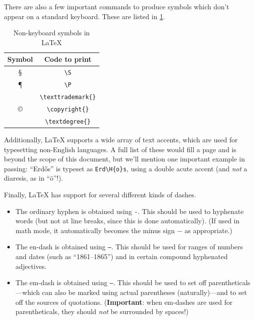 \documentclass{article}
\newcommand*{\code}[1]{\texttt{#1}}
\begin{document}
There are also a few important commands to produce symbols which don't appear on a standard keyboard.
These are listed in \cref{tab:nonkbsymbols}.

\begin{table}[htb]
  \centering{}
  \begin{tabular}{c c}
    \toprule
    Symbol & Code to print \\ \midrule
    \S  & \code{\textbackslash{}S} \\
    \P  & \code{\textbackslash{}P} \\
    \texttrademark{} & \code{\textbackslash{}texttrademark\{\}} \\
    \copyright{} & \code{\textbackslash{}copyright\{\}} \\
    \textdegree{} & \code{\textbackslash{}textdegree\{\}} \\
    \bottomrule
  \end{tabular}
  \caption{Non-keyboard symbols in \LaTeX{}}
  \label{tab:nonkbsymbols}
\end{table}

Additionally, \LaTeX{} supports a wide array of text accents, which are used for typesetting non-English languages.
A full list of these would fill a page and is beyond the scope of this document, but we'll mention one important example in passing: \enquote{Erd\H{o}s} is typeset as \code{Erd\textbackslash{}H\{o\}s}, using a double acute accent (and \emph{not} a diaresis, as in \enquote{\"{o}}!).

Finally, \LaTeX{} has support for several different kinds of dashes.
\begin{itemize}
\item
  The ordinary hyphen is obtained using \code{-}.
  This should be used to hyphenate words (but not at line breaks, since this is done automatically).
  (If used in math mode, it automatically becomes the minus sign $-$ as appropriate.)

\item
  The en-dash is obtained using \code{--}.
  This should be used for ranges of numbers and dates (such as \enquote{1861--1865}) and in certain compound hyphenated adjectives.

\item
  The em-dash is obtained using \code{---}.
  This should be used to set off parentheticals---which can also be marked using actual parentheses (naturally)---and to set off the sources of quotations.
  (\textbf{Important}: when em-dashes are used for parentheticals, they should \emph{not} be surrounded by spaces!)
\end{itemize}
\end{document}
